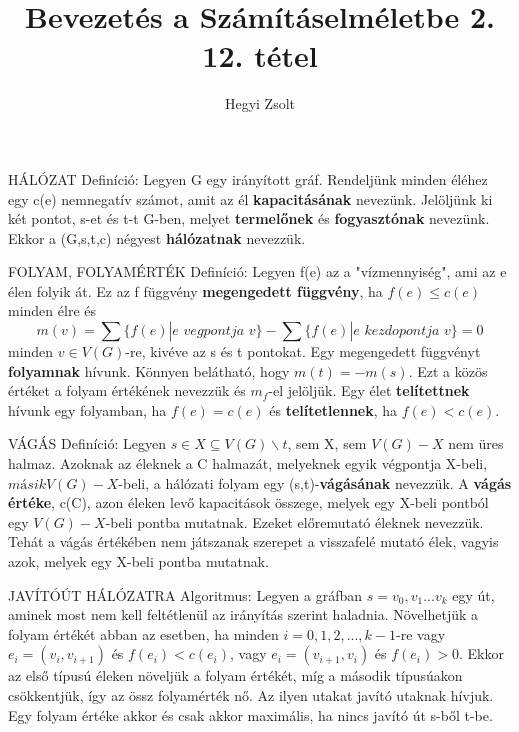 \documentclass[]{article}
\title{Bevezetés a Számításelméletbe 2.\\{\large 12. tétel}}
\author{Hegyi Zsolt}
\begin{document}
\maketitle
\begin{shaded}
HÁLÓZAT Definíció: Legyen G egy irányított gráf. Rendeljünk minden éléhez egy c(e) nemnegatív számot, amit az él \textbf{kapacitásának} nevezünk. Jelöljünk ki két pontot, s-et és t-t G-ben, melyet \textbf{termelőnek} és \textbf{fogyasztónak} nevezünk. Ekkor a (G,s,t,c) négyest \textbf{hálózatnak} nevezzük.
\end{shaded}
\begin{shaded}
FOLYAM, FOLYAMÉRTÉK Definíció: Legyen f(e) az a "vízmennyiség", ami az e élen folyik át. Ez az f függvény \textbf{megengedett függvény}, ha $f(e) \leq c(e)$ minden élre és
$$m(v) = \sum\{f(e)|e\,\,vegpontja\,\,v\} - \sum\{f(e) | e\,\,kezdopontja\,\,v\} = 0$$
minden $v\in V(G)$-re, kivéve az s és t pontokat. Egy megengedett függvényt \textbf{folyamnak} hívunk. Könnyen belátható, hogy $m(t) = -m(s)$. Ezt a közös értéket a folyam értékének nevezzük és $m_f$-el jelöljük. Egy élet \textbf{telítettnek} hívunk egy folyamban, ha $f(e) = c(e)$ és \textbf{telítetlennek}, ha $f(e) < c(e)$.
\end{shaded}
\begin{shaded}
VÁGÁS Definíció: Legyen $s \in X \subseteq V(G) \backslash {t}$, sem X, sem $V(G) - X$ nem üres halmaz. Azoknak az éleknek a C halmazát, melyeknek egyik végpontja X-beli, $másik V(G) - X$-beli, a hálózati folyam egy (s,t)-\textbf{vágásának} nevezzük. A \textbf{vágás értéke}, c(C), azon éleken levő kapacitások összege, melyek egy X-beli pontból egy $V(G) - X$-beli pontba mutatnak. Ezeket előremutató éleknek nevezzük. Tehát a vágás értékében nem játszanak szerepet a visszafelé mutató élek, vagyis azok, melyek egy X-beli pontba mutatnak.
\end{shaded}
\begin{framed}
JAVÍTÓÚT HÁLÓZATRA Algoritmus: Legyen a gráfban $s = v_0, v_1... v_k$ egy út, aminek most nem kell feltétlenül az irányítás szerint haladnia. Növelhetjük a folyam értékét abban az esetben, ha minden $i = 0,1,2,...,k-1$-re vagy $e_i = (v_i , v_{i + 1})$ és $f(e_i) < c(e_i) $, vagy $e_i = (v_{i + 1} , v_i )$ és $f(e_i) > 0 $.
Ekkor az első típusú éleken növeljük a folyam értékét, míg a második típusúakon csökkentjük, így az össz folyamérték nő. Az ilyen utakat javító utaknak hívjuk.\\ Egy folyam értéke akkor és csak akkor maximális, ha nincs javító út s-ből t-be.
\end{framed}
\end{document}

